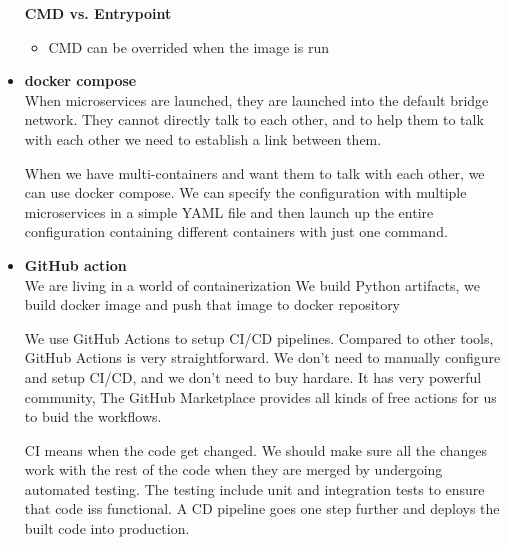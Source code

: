 \documentclass{article}
\begin{document}
\begin{itemize}
\textbf{CMD vs. Entrypoint}
\begin{itemize}
\item CMD can be overrided when the image is run
\end{itemize}
\item \textbf{docker compose}\\
When microservices are launched, they are launched into the default bridge network. They cannot directly talk to each other, and to help them to talk with each other we need to establish a link between them.

When we have multi-containers and want them to talk with each other, we can use docker compose. We can specify the configuration with multiple microservices in a simple YAML file and then launch up the entire configuration containing different containers with just one command.

\item \textbf{GitHub action}\\
We are living in a world of containerization
We build Python artifacts, we build docker image and push that image to docker repository

We use GitHub Actions to setup CI/CD pipelines. Compared to other tools, GitHub Actions is very straightforward. We don't need to manually configure and setup CI/CD, and we don't need to buy hardare. It has very powerful community, The GitHub Marketplace provides all kinds of free actions for us to buid the workflows.

CI means when the code get changed. We should make sure all the changes work with the rest of the code when they are merged by undergoing automated testing. The testing include unit and integration tests to ensure that code iss functional. A CD pipeline goes one step further and deploys the built code into production.

\end{itemize}
\end{document}

